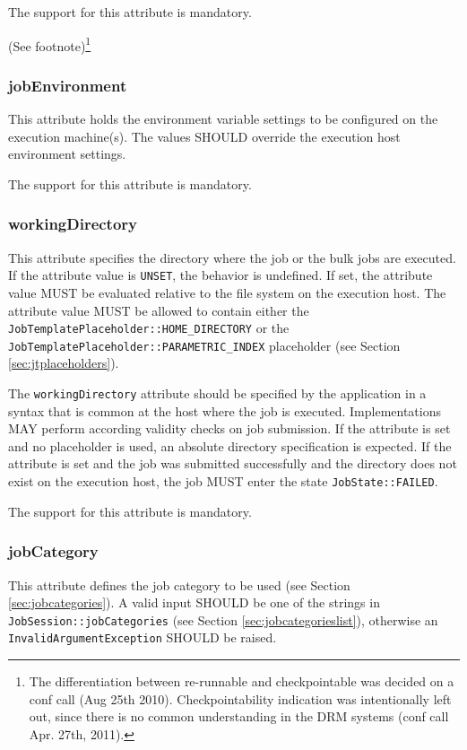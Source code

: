 \documentclass{article}
\newcommand{\h}[1]{\lstinline|#1|}
\newcommand{\rat}[1]{ {\tiny(See footnote)}\footnote{#1} }
\begin{document}
The support for this attribute is mandatory.

\rat{
The differentiation between re-runnable and checkpointable was decided on a conf call (Aug 25th 2010). Checkpointability indication was intentionally left out, since there is no common understanding in the DRM systems (conf call Apr. 27th, 2011).
}

\subsubsection{jobEnvironment}

This attribute holds the environment variable settings to be configured on the execution machine(s). The values SHOULD override the execution host environment settings. 

The support for this attribute is mandatory.

\subsubsection{workingDirectory}

This attribute specifies the directory where the job or the bulk jobs are executed. If the attribute value is \h{UNSET}, the behavior is undefined. If set, the attribute value MUST be evaluated relative to the file system on the execution host. The attribute value MUST be allowed to contain either the \h{JobTemplatePlaceholder::HOME_DIRECTORY} or the \h{JobTemplatePlaceholder::PARAMETRIC_INDEX} placeholder (see Section \ref{sec:jtplaceholders}).

The \h{workingDirectory} attribute should be specified by the application in a syntax that is common at the host where the job is executed. Implementations MAY perform according validity checks on job submission. If the attribute is set and no placeholder is used, an absolute directory specification is expected. If the attribute is set and the job was submitted successfully and the directory does not exist on the execution host, the job MUST enter the state \h{JobState::FAILED}.

The support for this attribute is mandatory.

\subsubsection{jobCategory}

This attribute defines the job category to be used (see Section \ref{sec:jobcategories}). A valid input SHOULD be one of the strings in \h{JobSession::jobCategories} (see Section \ref{sec:jobcategorieslist}), otherwise an \h{InvalidArgumentException} SHOULD be raised.
\end{document}
